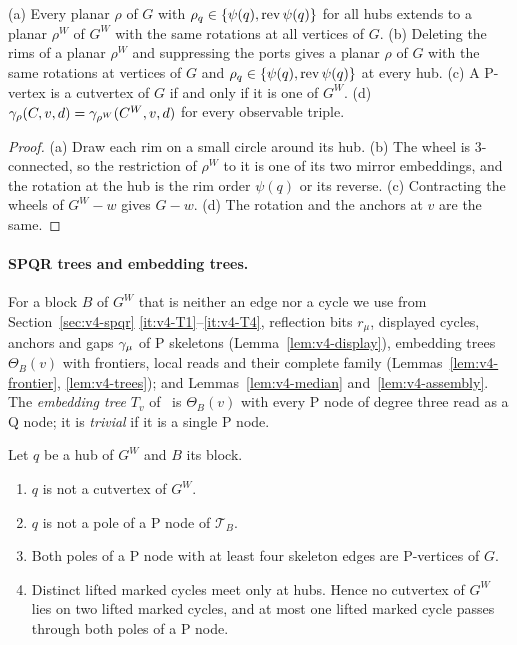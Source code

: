 \begin{lemma}[wheels]\label{lem:eng4-wheel}
(a) Every planar $\rho$ of $G$ with $\rho_q\in\{\psi(q),\operatorname{rev}\psi(q)\}$ for
all hubs extends to a planar $\rho^W$ of $G^W$ with the same rotations at all
vertices of $G$. (b) Deleting the rims of a planar $\rho^W$ and suppressing
the ports gives a planar $\rho$ of $G$ with the same rotations at vertices of
$G$ and $\rho_q\in\{\psi(q),\operatorname{rev}\psi(q)\}$ at every hub. (c) A P-vertex is a
cutvertex of $G$ if and only if it is one of $G^W$. (d)
$\gamma_\rho(C,v,d)=\gamma_{\rho^W}(C^W,v,d)$ for every observable triple.
\end{lemma}

\begin{proof}
(a) Draw each rim on a small circle around its hub. (b) The wheel is $3$-connected, so the restriction of $\rho^W$ to it is one
of its two mirror embeddings, and the rotation at the hub is the rim order
$\psi(q)$ or its reverse. (c) Contracting the wheels of $G^W-w$ gives $G-w$. (d)
The rotation and the anchors at $v$ are the same.
\end{proof}

\paragraph{SPQR trees and embedding trees.} For a block $B$ of $G^W$ that is
neither an edge nor a cycle we use from Section~\ref{sec:v4-spqr}
\ref{it:v4-T1}--\ref{it:v4-T4}, reflection bits $r_\mu$, displayed cycles,
anchors and gaps $\gamma_\mu$ of P skeletons (Lemma~\ref{lem:v4-display}),
embedding trees $\Theta_B(v)$ with frontiers, local reads and their complete
family (Lemmas~\ref{lem:v4-frontier}, \ref{lem:v4-trees}); and
Lemmas~\ref{lem:v4-median} and~\ref{lem:v4-assembly}. The \emph{embedding tree} $T_v$
of~\cite[Section~2]{BFR21} is $\Theta_B(v)$ with every P node of degree three
read as a Q node; it is \emph{trivial} if it is a single P node.

\begin{lemma}[Q-intersections]\label{lem:eng4-qint}
Let $q$ be a hub of $G^W$ and $B$ its block.
\begin{enumerate}[label=(\alph*),nosep]
\item $q$ is not a cutvertex of $G^W$.
\item $q$ is not a pole of a P node of $\mathcal T_B$.
\item Both poles of a P node with at least four skeleton edges are
  P-vertices of $G$.
\item Distinct lifted marked cycles meet only at hubs. Hence no cutvertex of
  $G^W$ lies on two lifted marked cycles, and at most one lifted marked cycle
  passes through both poles of a P node.
\end{enumerate}
\end{lemma}

